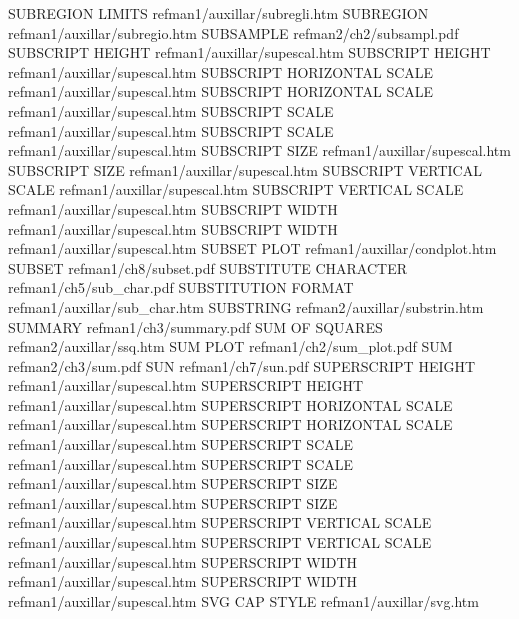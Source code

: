 SUBREGION LIMITS                        refman1/auxillar/subregli.htm
SUBREGION                               refman1/auxillar/subregio.htm
SUBSAMPLE                               refman2/ch2/subsampl.pdf
SUBSCRIPT HEIGHT                        refman1/auxillar/supescal.htm
SUBSCRIPT HEIGHT                        refman1/auxillar/supescal.htm
SUBSCRIPT HORIZONTAL SCALE              refman1/auxillar/supescal.htm
SUBSCRIPT HORIZONTAL SCALE              refman1/auxillar/supescal.htm
SUBSCRIPT SCALE                         refman1/auxillar/supescal.htm
SUBSCRIPT SCALE                         refman1/auxillar/supescal.htm
SUBSCRIPT SIZE                          refman1/auxillar/supescal.htm
SUBSCRIPT SIZE                          refman1/auxillar/supescal.htm
SUBSCRIPT VERTICAL SCALE                refman1/auxillar/supescal.htm
SUBSCRIPT VERTICAL SCALE                refman1/auxillar/supescal.htm
SUBSCRIPT WIDTH                         refman1/auxillar/supescal.htm
SUBSCRIPT WIDTH                         refman1/auxillar/supescal.htm
SUBSET PLOT                             refman1/auxillar/condplot.htm
SUBSET                                  refman1/ch8/subset.pdf
SUBSTITUTE CHARACTER                    refman1/ch5/sub_char.pdf
SUBSTITUTION FORMAT                     refman1/auxillar/sub_char.htm
SUBSTRING                               refman2/auxillar/substrin.htm
SUMMARY                                 refman1/ch3/summary.pdf
SUM OF SQUARES                          refman2/auxillar/ssq.htm
SUM PLOT                                refman1/ch2/sum_plot.pdf
SUM                                     refman2/ch3/sum.pdf
SUN                                     refman1/ch7/sun.pdf
SUPERSCRIPT HEIGHT                      refman1/auxillar/supescal.htm
SUPERSCRIPT HEIGHT                      refman1/auxillar/supescal.htm
SUPERSCRIPT HORIZONTAL SCALE            refman1/auxillar/supescal.htm
SUPERSCRIPT HORIZONTAL SCALE            refman1/auxillar/supescal.htm
SUPERSCRIPT SCALE                       refman1/auxillar/supescal.htm
SUPERSCRIPT SCALE                       refman1/auxillar/supescal.htm
SUPERSCRIPT SIZE                        refman1/auxillar/supescal.htm
SUPERSCRIPT SIZE                        refman1/auxillar/supescal.htm
SUPERSCRIPT VERTICAL SCALE              refman1/auxillar/supescal.htm
SUPERSCRIPT VERTICAL SCALE              refman1/auxillar/supescal.htm
SUPERSCRIPT WIDTH                       refman1/auxillar/supescal.htm
SUPERSCRIPT WIDTH                       refman1/auxillar/supescal.htm
SVG CAP STYLE                           refman1/auxillar/svg.htm
